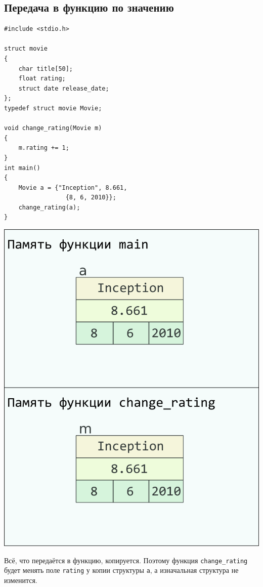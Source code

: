 \documentclass{article}
\begin{document}
\subsection*{Передача в функцию по значению}
\begin{multicols}{2}
\begin{lstlisting}
#include <stdio.h>

struct movie
{
	char title[50];
	float rating;
	struct date release_date;
};
typedef struct movie Movie;

void change_rating(Movie m)
{
	m.rating += 1;
}
int main()
{
	Movie a = {"Inception", 8.661, 
	             {8, 6, 2010}};
	change_rating(a);
}
\end{lstlisting}
\columnbreak
\begin{center}
\includegraphics[scale=1]{../images/pointer_schemes/function_by_value.png}
\end{center}
\end{multicols}
Всё, что передаётся в функцию, копируется. Поэтому функция \texttt{change\_rating} будет менять
поле \texttt{rating} у копии структуры \texttt{a}, а изначальная структура не изменится.
\end{document}
